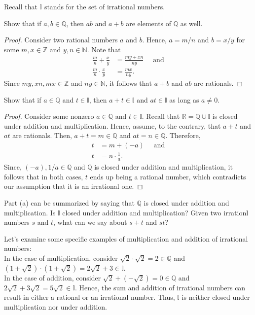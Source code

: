 \documentclass[12pt]{article}
\newcommand{\N}{\mathbb{N}}
\newcommand{\Z}{\mathbb{Z}}
\newcommand{\R}{\mathbb{R}}
\newcommand{\Q}{\mathbb{Q}}
\newenvironment{problem}[2][Problem]{\begin{trivlist}
		\item[\hskip \labelsep {\bfseries #1}\hskip \labelsep {\bfseries #2.}]}{\end{trivlist}}
\newenvironment{solution}[2][Solution]{\begin{trivlist}
		\item[\hskip \labelsep {\bfseries #1}\hskip \labelsep {\bfseries #2.}]}{\end{trivlist}}
\begin{document}
	\begin{problem}{1.4.1}
		Recall that $\mathbb{I}$ stands for the set of irrational numbers.
		\begin{enumerate}[label=(\alph*)]
			\item Show that if $a,b\in \Q$, then $ab$ and $a+b$ are elements of $\Q$ as well.
			\begin{proof}
				Consider two rational numbers $a$ and $b$. Hence, $a= m/n$ and $b=x/y$ for some $m,x\in \Z$ and $y,n\in \N$. Note that 
				\begin{align*}
					\frac{m}{n} + \frac{x}{y} &= \frac{my+xn}{ny}\quad \text{ and}\\
					\frac{m}{n}\cdot \frac{x}{y} &= \frac{mx}{ny}.
				\end{align*}
				Since $my,xn,mx \in \Z$ and $ny\in \N$, it follows that $a+b$ and $ab$ are rationals.
			\end{proof}
			\item Show that if $a\in \Q$ and $t\in \mathbb{I}$, then $a+t\in \mathbb{I}$ and $at\in \mathbb{I}$ as long as $a\neq 0$.
			\begin{proof}
				Consider some nonzero $a\in \Q$ and $t\in \mathbb{I}$. Recall that $\R = \Q\cup \mathbb{I}$ is closed under addition and multiplication. Hence, assume, to the contrary, that $a+t$ and $at$ are rationals. Then, $a+t = m\in \Q$ and $at = n\in \Q$. Therefore,
				\begin{align*}
					t &= m + (-a) \quad \text{ and}\\
					t &= n \cdot \frac{1}{a}.
				\end{align*} 
				Since, $(-a), 1/a \in \Q$ and $\Q$ is closed under addition and multiplication, it follows that in both cases, $t$ ends up being a rational number, which contradicts our assumption that it is an irrational one.  
			\end{proof}
			\item Part (a) can be summarized by saying that $\Q$ is closed under addition and multiplication. Is $\mathbb{I}$ closed under addition and multiplication? Given two irrationl numbers $s$ and $t$, what can we say about $s+t$ and $st$?
			\begin{solution}{c}
				Let's examine some specific examples of multiplication and addition of irrational numbers:\\
				In the case of multiplication, consider $\sqrt{2}\cdot \sqrt{2} = 2\in \Q$ and $(1+\sqrt{2})\cdot(1 +\sqrt{2}) = 2\sqrt{2} + 3\in \mathbb{I}$. \\
				In the case of addition,  consider $\sqrt{2} + (-\sqrt{2}) = 0 \in \Q$ and $2\sqrt{2} + 3\sqrt{2} = 5\sqrt{2} \in \mathbb{I}$. Hence, the sum and addition of irrational numbers can result in either a rational or an irrational number. Thus, $\mathbb{I}$ is neither closed under multiplication nor under addition.
			\end{solution}
		\end{enumerate}
	\end{problem}
	
\end{document}
